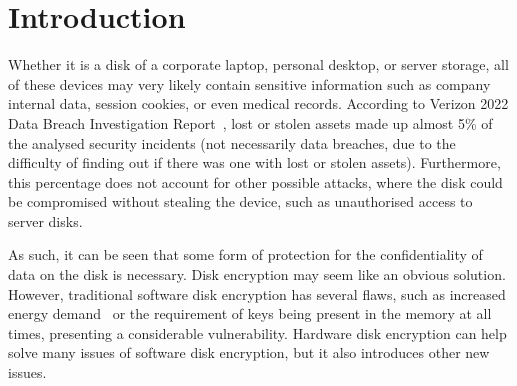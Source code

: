 
\chapter{Introduction}



Whether it is a disk of a corporate laptop, personal desktop, or server storage, all of these devices may very likely contain sensitive information such as company internal data, session cookies, or even medical records.
According to Verizon 2022 Data Breach Investigation Report~\cite{verizon_dbir}, lost or stolen assets made up almost 5\% of the analysed security incidents (not necessarily data breaches, due to the difficulty of finding out if there was one with lost or stolen assets). Furthermore, this percentage does not account for other possible attacks, where the disk could be compromised without stealing the device, such as unauthorised access to server disks.


As such, it can be seen that some form of protection for the confidentiality of data on the disk is necessary. Disk encryption may seem like an obvious solution. However, traditional software disk encryption has several flaws, such as increased energy demand~\cite{comparing_the_power} or the requirement of keys being present in the memory at all times, presenting a considerable vulnerability.
Hardware disk encryption can help solve many issues of software disk encryption, but it also introduces other new issues.



